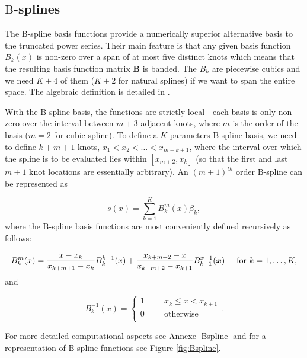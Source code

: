 \documentclass[]{book}
\begin{document}
\hypertarget{mathrmb-splines}{%
\subsection{\texorpdfstring{\(\mathrm{B}\)-splines}{\textbackslash{}mathrm\{B\}-splines}}\label{mathrmb-splines}}

The \(\mathrm{B}\)-spline basis functions provide a numerically superior
alternative basis to the truncated power series. Their main feature is
that any given basis function \(\mathit{B}_k(x)\) is non-zero over a span
of at most five distinct knots which means that the resulting basis
function matrix \(\mathbf{B}\) is banded. The \(\mathit{B}_k\) are piecewise cubics
and we need \(K + 4\) of them (\(K + 2\) for natural splines) if we want to
span the entire space. The algebraic definition is detailed in
\citep{de_boor_practical_1975}.

With the \(\mathrm{B}\)-spline basis, the functions are strictly local -
each basis is only non-zero over the interval between \(m+3\) adjacent
knots, where \(m\) is the order of the basis (\(m = 2\) for cubic spline).
To define a \(K\) parameters \(\mathrm{B}\)-spline basis, we need to define
\(k+m+1\) knots, \(x_1 < x_2 < \dots < x_{m+k+1}\), where the interval over
which the spline is to be evaluated lies within \([x_{m+2},x_k]\) (so that
the first and last \(m+1\) knot locations are essentially arbitrary). An
\((m+1)^{th}\) order \(\mathrm{B}\)-spline can be represented as

\[s(x) = \sum_{k=1}^K B_k^m(x)\beta_k,\] where the \(\mathrm{B}\)-spline
basis functions are most conveniently defined recursively as follows:

\[B_k^m (x) = \frac{x-x_k}{x_{k+m+1} - x_k}B_k^{k-1}(x) + \frac{x_{k+m+2} - x}{x_{k+m+2}-x_{k+1}}B_{k+1}^{x-1}(\boldsymbol{x}) \hspace{.5cm} \text{for } k=1,\dots,K,\]
and

\[B_k^{-1}(x) =  \left\{
    \begin{array}{ll}
        1 \hspace{1cm} x_k \leq x < x_{k+1}  \\
        0 \hspace{1cm} \text{otherwise} \\
    \end{array}
\right. .\]

For more detailed computational aspects see Annexe \ref{Bspline} and
for a representation of \(\mathrm{B}\)-spline functions see Figure
\ref{fig:Bspline}.
\end{document}
